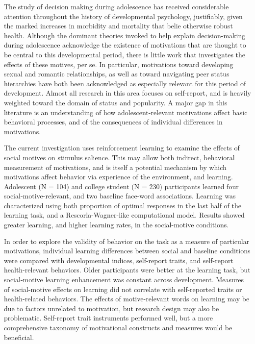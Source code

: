 The study of decision making during adolescence has received considerable attention throughout the history of developmental psychology, justifiably, given the marked increases in morbidity and mortality that belie otherwise robust health.
Although the dominant theories invoked to help explain decision-making during adolescence acknowledge the existence of motivations that are thought to be central to this developmental period, there is little work that investigates the effects of these motives, per se.
In particular, motivations toward developing sexual and romantic relationships, as well as toward navigating peer status hierarchies have both been acknowledged as especially relevant for this period of development.
Almost all research in this area focuses on self-report, and is heavily weighted toward the domain of status and popularity.
A major gap in this literature is an understanding of how adolescent-relevant motivations affect basic behavioral processes, and of the consequences of individual differences in motivations.

The current investigation uses reinforcement learning to examine the effects of social motives on stimulus salience. 
This may allow both indirect, behavioral measurement of motivations, and is itself a potential mechanism by which motivations affect behavior via experience of the environment, and learning.
Adolescent (N = 104) and college student (N = 230) participants learned four social-motive-relevant, and two baseline face-word associations.
Learning was characterized using both proportion of optimal responses in the last half of the learning task, and a Rescorla-Wagner-like computational model.
Results showed greater learning, and higher learning rates, in the social-motive conditions.

In order to explore the validity of behavior on the task as a measure of particular motivations, individual learning differences  between social and baseline conditions were compared with developmental indices, self-report traits, and self-report health-relevant behaviors.
Older participants were better at the learning task, but social-motive learning enhancement was constant across development.
Measures of social-motive effects on learning did not correlate with self-reported traits or health-related behaviors.
The effects of motive-relevant words on learning may be due to factors unrelated to motivation, but research design may also be problematic.
Self-report trait instruments performed well, but a more comprehensive taxonomy of motivational constructs and measures would be beneficial.

